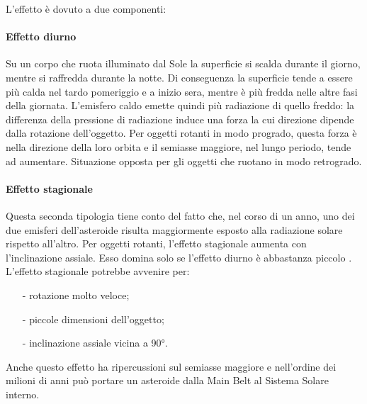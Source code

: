 \documentclass[a4paper,11pt,openright]{book}
\begin{document}
L’effetto è dovuto a due componenti:

\paragraph*{Effetto diurno}
Su un corpo che ruota illuminato dal Sole la superficie si scalda durante il giorno, mentre si raffredda durante la notte. Di conseguenza la superficie tende a essere più calda nel tardo pomeriggio e a inizio sera, mentre è più fredda nelle altre fasi della giornata. L’emisfero caldo emette quindi più radiazione di quello freddo: la differenza della pressione di radiazione induce una forza la cui direzione dipende dalla rotazione dell’oggetto. Per oggetti rotanti in modo progrado, questa forza è nella direzione della loro orbita e il semiasse maggiore, nel lungo periodo, tende ad aumentare. Situazione opposta per gli oggetti che ruotano in modo retrogrado.

\paragraph*{Effetto stagionale}
Questa seconda tipologia tiene conto del fatto che, nel corso di un anno, uno dei due emisferi dell’asteroide risulta maggiormente esposto alla radiazione solare rispetto all’altro. Per oggetti rotanti, l’effetto stagionale aumenta con l’inclinazione assiale. Esso domina solo se l’effetto diurno è abbastanza piccolo \citep{Vokrouhlicky_1999}.
L’effetto stagionale potrebbe avvenire per:

\begin{itemize}
    \item[-] rotazione molto veloce;
    \item[-] piccole dimensioni dell’oggetto;
    \item[-] inclinazione assiale vicina a 90°.
\end{itemize}

Anche questo effetto ha ripercussioni sul semiasse maggiore e nell'ordine dei milioni di anni può portare un asteroide dalla Main Belt al Sistema Solare interno.
\end{document}
